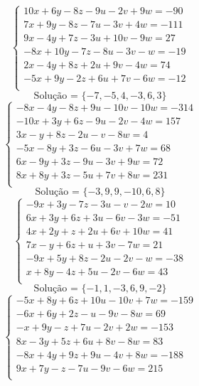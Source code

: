 \documentclass[12pt,oneside,a4paper]{article}
\begin{document}
\vspace{\baselineskip}
\begin{equation*}
\begin{cases}
10x+6y-8z-9u-2v+9w=-90 \\
7x+9y-8z-7u-3v+4w=-111 \\
9x-4y+7z-3u+10v-9w=27 \\
-8x+10y-7z-8u-3v-w=-19 \\
2x-4y+8z+2u+9v-4w=74 \\
-5x+9y-2z+6u+7v-6w=-12 \\
\end{cases}
\end{equation*}
\begin{equation*}
\text{Solução = }\{-7,-5,4,-3,6,3\}
\end{equation*}
\vspace{\baselineskip}
\begin{equation*}
\begin{cases}
-8x-4y-8z+9u-10v-10w=-314 \\
-10x+3y+6z-9u-2v-4w=157 \\
3x-y+8z-2u-v-8w=4 \\
-5x-8y+3z-6u-3v+7w=68 \\
6x-9y+3z-9u-3v+9w=72 \\
8x+8y+3z-5u+7v+8w=231 \\
\end{cases}
\end{equation*}
\begin{equation*}
\text{Solução = }\{-3,9,9,-10,6,8\}
\end{equation*}
\vspace{\baselineskip}
\begin{equation*}
\begin{cases}
-9x+3y-7z-3u-v-2w=10 \\
6x+3y+6z+3u-6v-3w=-51 \\
4x+2y+z+2u+6v+10w=41 \\
7x-y+6z+u+3v-7w=21 \\
-9x+5y+8z-2u-2v-w=-38 \\
x+8y-4z+5u-2v-6w=43 \\
\end{cases}
\end{equation*}
\begin{equation*}
\text{Solução = }\{-1,1,-3,6,9,-2\}
\end{equation*}
\vspace{\baselineskip}
\begin{equation*}
\begin{cases}
-5x+8y+6z+10u-10v+7w=-159 \\
-6x+6y+2z-u-9v-8w=69 \\
-x+9y-z+7u-2v+2w=-153 \\
8x-3y+5z+6u+8v-8w=83 \\
-8x+4y+9z+9u-4v+8w=-188 \\
9x+7y-z-7u-9v-6w=215 \\
\end{cases}
\end{equation*}
\end{document}
